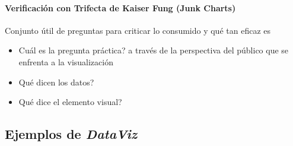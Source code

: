 \paragraph{Verificación con Trifecta de Kaiser Fung (Junk Charts)}
Conjunto útil de preguntas para criticar lo consumido y qué tan eficaz es
\begin{itemize}
    \item {Cuál es la pregunta práctica? a través de la perspectiva del público que se enfrenta a la visualización}
    \item {Qué dicen los datos?}
    \item {Qué dice el elemento visual?}
\end{itemize}

\subsection{Ejemplos de \textit{DataViz}}
